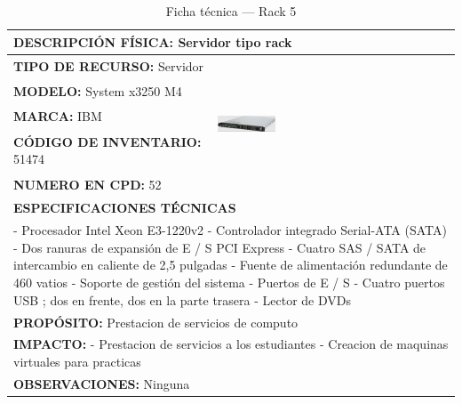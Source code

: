 \begin{table}[H]
\centering
\caption{Ficha técnica --- Rack 5}\label{tab:rack-5}
\begin{tabular}{|p{}|p{}|}
\hline
\multicolumn{2}{|l|}{\textbf{DESCRIPCIÓN FÍSICA:} Servidor tipo rack} \\ \hline
\textbf{TIPO DE RECURSO:} Servidor & 
\multirow{5}{*}{\includegraphics[width=0.25\textwidth,height=4cm,keepaspectratio]{tablas-images/cp1/racks/rack-1.png}} \\ \cline{1-1}
\textbf{MODELO:} System x3250 M4 & \\ \cline{1-1}
\textbf{MARCA:} IBM & \\ \cline{1-1}
\textbf{CÓDIGO DE INVENTARIO:} 51474 & \\ \cline{1-1}
\textbf{NUMERO EN CPD:} 52 & \\ \hline
\multicolumn{2}{|l|}{\textbf{ESPECIFICACIONES TÉCNICAS}} \\ \hline
\multicolumn{2}{|p{0.95\textwidth}|}{
\footnotesize
- Procesador Intel Xeon E3-1220v2
- Controlador integrado Serial-ATA (SATA)
- Dos ranuras de expansión de E / S PCI Express
- Cuatro SAS / SATA de intercambio en caliente de 2,5 pulgadas
- Fuente de alimentación redundante de 460 vatios
- Soporte de gestión del sistema
- Puertos de E / S
- Cuatro puertos USB ; dos en frente, dos en la parte trasera
- Lector de DVDs
} \\ \hline
\multicolumn{2}{|l|}{\textbf{PROPÓSITO:} Prestacion de servicios de computo} \\ \hline
\multicolumn{2}{|p{0.9\textwidth}|}{\textbf{IMPACTO:} - Prestacion de servicios a los estudiantes
- Creacion de maquinas virtuales para practicas} \\ \hline
\multicolumn{2}{|l|}{\textbf{OBSERVACIONES:} Ninguna} \\ \hline
\end{tabular}
\end{table}

